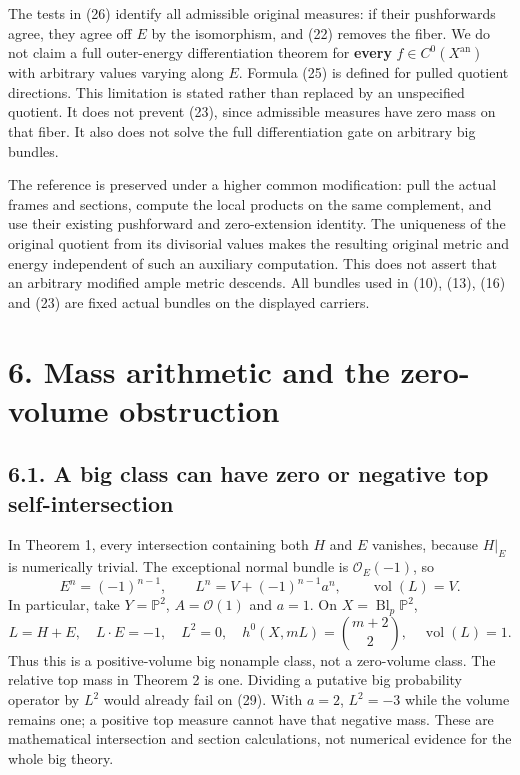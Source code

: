 \documentclass[
  10pt,
]{article}
\begin{document}
The tests in (26) identify all admissible original measures: if their
pushforwards agree, they agree off \(E\) by the isomorphism, and (22)
removes the fiber. We do not claim a full outer-energy differentiation
theorem for \textbf{every} \(f\in C^0(X^{\mathrm{an}})\) with arbitrary
values varying along \(E\). Formula (25) is defined for pulled quotient
directions. This limitation is stated rather than replaced by an
unspecified quotient. It does not prevent (23), since admissible
measures have zero mass on that fiber. It also does not solve the full
differentiation gate on arbitrary big bundles.

The reference is preserved under a higher common modification: pull the
actual frames and sections, compute the local products on the same
complement, and use their existing pushforward and zero-extension
identity. The uniqueness of the original quotient from its divisorial
values makes the resulting original metric and energy independent of
such an auxiliary computation. This does not assert that an arbitrary
modified ample metric descends. All bundles used in (10), (13), (16) and
(23) are fixed actual bundles on the displayed carriers.

\section{6. Mass arithmetic and the zero-volume
obstruction}\label{mass-arithmetic-and-the-zero-volume-obstruction}

\subsection{6.1. A big class can have zero or negative top
self-intersection}\label{a-big-class-can-have-zero-or-negative-top-self-intersection}

In Theorem 1, every intersection containing both \(H\) and \(E\)
vanishes, because \(H|_E\) is numerically trivial. The exceptional
normal bundle is \(\mathcal O_E(-1)\), so
\[ E^n=(-1)^{n-1},\qquad L^n=V+(-1)^{n-1}a^n,\qquad\operatorname{vol}(L)=V. \tag{28} \]
In particular, take \(Y=\mathbb P^2\), \(A=\mathcal O(1)\) and \(a=1\).
On \(X=\operatorname{Bl}_p\mathbb P^2\),
\[ L=H+E,\quad L\cdot E=-1,\quad L^2=0,\quad
 h^0(X,mL)=\binom{m+2}{2},\quad\operatorname{vol}(L)=1. \tag{29} \] Thus
this is a positive-volume big nonample class, not a zero-volume class.
The relative top mass in Theorem 2 is one. Dividing a putative big
probability operator by \(L^2\) would already fail on (29). With
\(a=2\), \(L^2=-3\) while the volume remains one; a positive top measure
cannot have that negative mass. These are mathematical intersection and
section calculations, not numerical evidence for the whole big theory.
\end{document}
